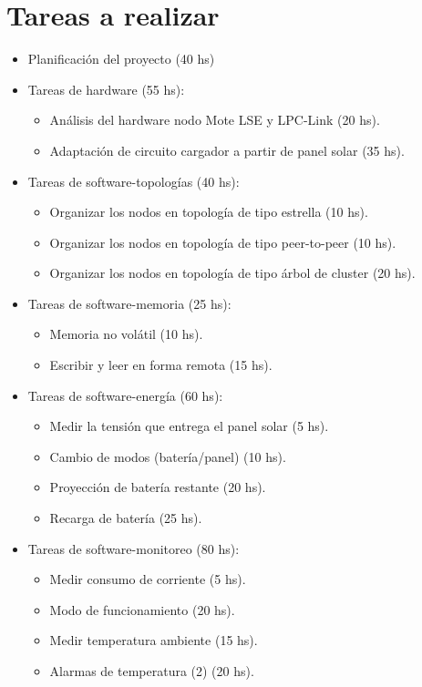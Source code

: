 \section{Tareas a realizar}
\label{sec:tareas}
\begin{itemize}
	\item Planificación del proyecto (40 hs)
	\item Tareas de hardware (55 hs):
	\begin{itemize}
	\item Análisis del hardware nodo Mote LSE y LPC-Link (20 hs).
	\item Adaptación de circuito cargador a partir de panel solar (35 hs).
	\end{itemize}
	\item Tareas de software-topologías (40 hs):
	\begin{itemize}
	\item Organizar los nodos en topología de tipo estrella (10 hs).
	\item Organizar los nodos en topología de tipo peer-to-peer (10 hs).
	\item Organizar los nodos en topología de tipo árbol de cluster (20 hs).
	\end{itemize}
	\item Tareas de software-memoria (25 hs):
	\begin{itemize}
	\item Memoria no volátil (10 hs).
	\item Escribir y leer en forma remota (15 hs).    
	\end{itemize}
	\item Tareas de software-energía (60 hs):
	\begin{itemize}
	\item Medir la tensión que entrega el panel solar (5 hs).
	\item Cambio de modos (batería/panel) (10 hs).
	\item Proyección de batería restante (20 hs).
	\item Recarga de batería (25 hs).
	\end{itemize}
	\item Tareas de software-monitoreo (80 hs):
	\begin{itemize}
	\item Medir consumo de corriente (5 hs).
	\item Modo de funcionamiento (20 hs).
	\item Medir temperatura ambiente (15 hs).
	\item Alarmas de temperatura (2) (20 hs).

\end{itemize}
\end{itemize}
